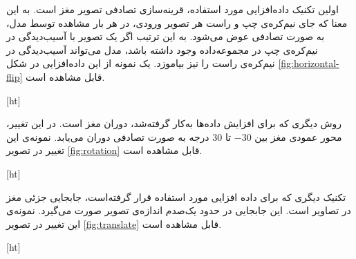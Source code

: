  اولین تکنیک داده‌افزایی مورد استفاده، قرینه‌سازی تصادفی تصویر مغز است.
 به این معنا که جای نیم‌کره‌ی چپ و راست هر تصویر ورودی، در هر بار مشاهده توسط مدل، به صورت تصادفی
 عوض می‌شود.
 به این ترتیب اگر یک تصویر با آسیب‌دیدگی در نیم‌کره‌ی چپ در مجموعه‌داده وجود داشته باشد، مدل می‌تواند آسیب‌دیدگی در نیم‌کره‌ی راست را نیز بیاموزد.
 یک نمونه از این داده‌افزایی در شکل \ref{fig:horizontal-flip} قابل مشاهده است.


[ht]

روش دیگری که برای افزایش داده‌ها به‌کار گرفته‌شد، دوران مغز است. در این 
تغییر، محور عمودی مغز بین $-30$ تا $30$ درجه به صورت تصادفی دوران می‌یابد.
نمونه‌ی این تغییر در تصویر \ref{fig:rotation}
قابل مشاهده است.


[ht]

تکنیک دیگری که برای داده افزایی مورد استفاده قرار گرفته‌است،
جابجایی جزئی مغز در تصاویر است.
این جابجایی در حدود یک‌صدم اندازه‌ی تصویر صورت می‌گیرد.
نمونه‌ی این تغییر در تصویر 
\ref{fig:translate}
قابل مشاهده است.


[ht]


